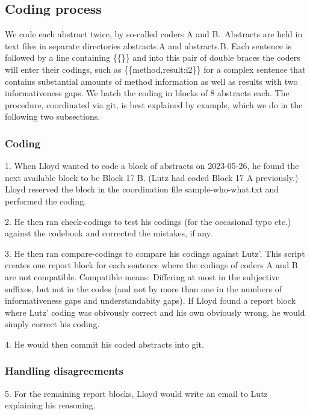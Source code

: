 \documentclass[10pt,journal,compsoc]{IEEEtran}
\newcommand{\Prg}[1]{\bgroup\ttfamily #1\egroup}  %
\begin{document}
\subsection{Coding process}

\noindent
We code each abstract twice, by so-called coders A and B.\ 
Abstracts are held in text files in separate directories \Prg{abstracts.A} and \Prg{abstracts.B}.
Each sentence is followed by a line containing \Prg{\{\{\}\}} and into this pair of
double braces the coders will enter their codings,
such as \Prg{\{\{method,result:i2\}\}} for a complex sentence that contains substantial
amounts of method information as well as results with two informativeness gaps.
We batch the coding in blocks of 8 abstracts each.
The procedure, coordinated via git, is best explained by example, 
which we do in the following two subsections. 


\subsubsection{Coding}

1. When Lloyd wanted to code a block of abstracts on 2023-05-26,
he found the next available block to be Block 17 B.
(Lutz had coded Block 17 A previously.)
Lloyd reserved the block in the coordination file \Prg{sample-who-what.txt}
and performed the coding.

2. He then ran \Prg{check-codings} to test his codings (for the occasional typo etc.)
against the codebook and corrected the mistakes, if any.

3. He then ran \Prg{compare-codings} to compare his codings against Lutz'.
This script creates one report block for each sentence where the codings
of coders A and B are not compatible.
Compatible means: Differing at most in the subjective suffixes, but not in the codes
(and not by more than one in the numbers of informativeness gaps and understandabity gaps).
If Lloyd found a report block where Lutz' coding was obivously correct and his own
obviously wrong, he would simply correct his coding.

4. He would then commit his coded abstracts into git.


\subsubsection{Handling disagreements}

5. For the remaining report blocks, Lloyd would write an email to Lutz explaining his reasoning.
\end{document}
